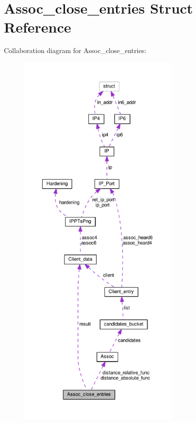 \hypertarget{struct_assoc__close__entries}{\section{Assoc\+\_\+close\+\_\+entries Struct Reference}
\label{struct_assoc__close__entries}
}


Collaboration diagram for Assoc\+\_\+close\+\_\+entries\+:
\nopagebreak
\begin{figure}[H]
\begin{center}
\leavevmode
\includegraphics[height=550pt]{struct_assoc__close__entries__coll__graph}
\end{center}
\end{figure}
